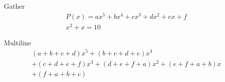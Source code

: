 \documentclass[a4paper]{article}
\begin{document}
Gather
\begin{gather}
P(x)=ax^{5}+bx^{4}+cx^{3}+dx^{2}+ex +f\\
x^2+x=10
\end{gather}

Multiline
\begin{multline*}
(a+b+c+d)x^{5}+(b+c+d+e)x^{4} \\
+(c+d+e+f)x^{3}+(d+e+f+a)x^{2}+(e+f+a+b)x\\
+ (f+a+b+c)
\end{multline*}
\end{document}
